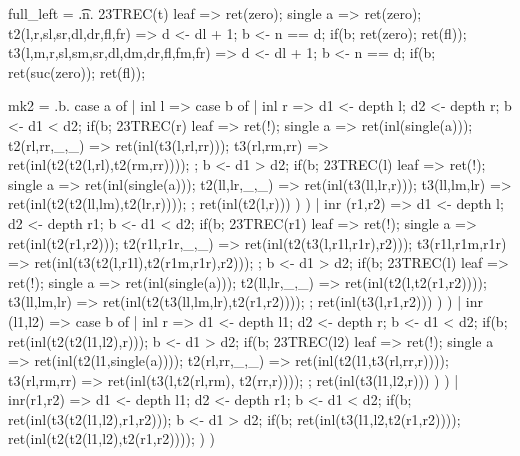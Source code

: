 \iffalse
full_left = \t.n. 
  23TREC(t){
    leaf => ret(zero);
    single a => ret(zero);
    t2(l,r,sl,sr,dl,dr,fl,fr) => 
      d <- dl + 1;
      b <- n == d;
      if(b; ret(zero); ret(fl));
    t3(l,m,r,sl,sm,sr,dl,dm,dr,fl,fm,fr) => 
      d <- dl + 1;
      b <- n == d;
      if(b; ret(suc(zero)); ret(fl));
  }


mk2 = \a.b. 
  case a of
    | inl l =>
      case b of
      | inl r =>
        d1 <- depth l;
        d2 <- depth r;
        b <- d1 < d2;
        if(b;
          23TREC(r){
            leaf => ret(!);
            single a => ret(inl(single(a)));
            t2(rl,rr,_,_) => ret(inl(t3(l,rl,rr)));
            t3(rl,rm,rr) => ret(inl(t2(t2(l,rl),t2(rm,rr))));
          };
          b <- d1 > d2;
          if(b;
            23TREC(l){
              leaf => ret(!);
              single a => ret(inl(single(a)));
              t2(ll,lr,_,_) => ret(inl(t3(ll,lr,r)));
              t3(ll,lm,lr) => ret(inl(t2(t2(ll,lm),t2(lr,r))));
            };
            ret(inl(t2(l,r)))
          )
        )
      | inr (r1,r2) => 
        d1 <- depth l;
        d2 <- depth r1;
        b <- d1 < d2;
        if(b;
          23TREC(r1){
            leaf => ret(!);
            single a => ret(inl(t2(r1,r2)));
            t2(r1l,r1r,_,_) => ret(inl(t2(t3(l,r1l,r1r),r2)));
            t3(r1l,r1m,r1r) => ret(inl(t3(t2(l,r1l),t2(r1m,r1r),r2)));
          };
          b <- d1 > d2;
          if(b;
            23TREC(l){
              leaf => ret(!);
              single a => ret(inl(single(a)));
              t2(ll,lr,_,_) => ret(inl(t2(l,t2(r1,r2))));
              t3(ll,lm,lr) => ret(inl(t2(t3(ll,lm,lr),t2(r1,r2))));
            };
            ret(inl(t3(l,r1,r2)))
          )
        )
    | inr (l1,l2) => 
      case b of
      | inl r =>
        d1 <- depth l1;
        d2 <- depth r;
        b <- d1 < d2;
        if(b;
          ret(inl(t2(t2(l1,l2),r)));
          b <- d1 > d2;
          if(b;
            23TREC(l2){
              leaf => ret(!);
              single a => ret(inl(t2(l1,single(a))));
              t2(rl,rr,_,_) => ret(inl(t2(l1,t3(rl,rr,r))));
              t3(rl,rm,rr) => ret(inl(t3(l,t2(rl,rm), t2(rr,r))));
            };
            ret(inl(t3(l1,l2,r)))
          )
        )
      | inr(r1,r2) => 
        d1 <- depth l1;
        d2 <- depth r1;
        b <- d1 < d2;
        if(b;
          ret(inl(t3(t2(l1,l2),r1,r2)));
          b <- d1 > d2;
          if(b;
            ret(inl(t3(l1,l2,t2(r1,r2))));
            ret(inl(t2(t2(l1,l2),t2(r1,r2))));
          )
        )

